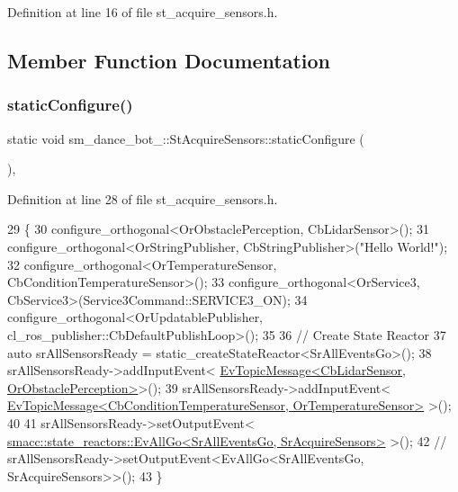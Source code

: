 Definition at line 16 of file st\+\_\+acquire\+\_\+sensors.\+h.



\subsection{Member Function Documentation}
\mbox{\label{structsm__dance__bot__2_1_1StAcquireSensors_aaeeb0ac3d0e8438deb7c29d07907674e}} 
\subsubsection{\texorpdfstring{static\+Configure()}{staticConfigure()}}
{\footnotesize\ttfamily static void sm\+\_\+dance\+\_\+bot\+\_\+::\+St\+Acquire\+Sensors\+::static\+Configure (\begin{DoxyParamCaption}{ }\end{DoxyParamCaption})\hspace{0.3cm}{\ttfamily [inline]}, {\ttfamily [static]}}



Definition at line 28 of file st\+\_\+acquire\+\_\+sensors.\+h.


\begin{DoxyCode}
29    \{
30       configure\_orthogonal<OrObstaclePerception, CbLidarSensor>();
31       configure\_orthogonal<OrStringPublisher, CbStringPublisher>(\textcolor{stringliteral}{"Hello World!"});
32       configure\_orthogonal<OrTemperatureSensor, CbConditionTemperatureSensor>();
33       configure\_orthogonal<OrService3, CbService3>(Service3Command::SERVICE3\_ON);
34       configure\_orthogonal<OrUpdatablePublisher, cl\_ros\_publisher::CbDefaultPublishLoop>();
35 
36       \textcolor{comment}{// Create State Reactor}
37       \textcolor{keyword}{auto} srAllSensorsReady = static\_createStateReactor<SrAllEventsGo>();
38       srAllSensorsReady->addInputEvent<
      \hyperlink{structsmacc_1_1default__events_1_1EvTopicMessage}{EvTopicMessage<CbLidarSensor, OrObstaclePerception>}>();
39       srAllSensorsReady->addInputEvent<
      \hyperlink{structsmacc_1_1default__events_1_1EvTopicMessage}{EvTopicMessage<CbConditionTemperatureSensor, OrTemperatureSensor>}
      >();
40 
41       srAllSensorsReady->setOutputEvent<
      \hyperlink{structsmacc_1_1state__reactors_1_1EvAllGo}{smacc::state\_reactors::EvAllGo<SrAllEventsGo, SrAcquireSensors>}
      >();
42       \textcolor{comment}{// srAllSensorsReady->setOutputEvent<EvAllGo<SrAllEventsGo, SrAcquireSensors>>();}
43    \}
\end{DoxyCode}


